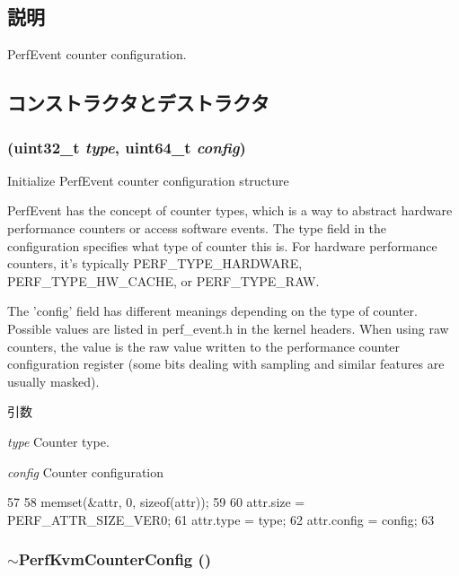 \subsection{説明}
PerfEvent counter configuration. 

\subsection{コンストラクタとデストラクタ}
\hypertarget{classPerfKvmCounterConfig_a55ed8d9cf8254a7598c16bab27f50737}{
\subsubsection[{PerfKvmCounterConfig}]{ ({\bf uint32\_\-t} {\em type}, \/  uint64\_\-t {\em config})}}
\label{classPerfKvmCounterConfig_a55ed8d9cf8254a7598c16bab27f50737}
Initialize PerfEvent counter configuration structure

PerfEvent has the concept of counter types, which is a way to abstract hardware performance counters or access software events. The type field in the configuration specifies what type of counter this is. For hardware performance counters, it's typically PERF\_\-TYPE\_\-HARDWARE, PERF\_\-TYPE\_\-HW\_\-CACHE, or PERF\_\-TYPE\_\-RAW.

The 'config' field has different meanings depending on the type of counter. Possible values are listed in perf\_\-event.h in the kernel headers. When using raw counters, the value is the raw value written to the performance counter configuration register (some bits dealing with sampling and similar features are usually masked).


\begin{DoxyParams}{引数}
\item[{\em type}]Counter type. \item[{\em config}]Counter configuration \end{DoxyParams}



\begin{DoxyCode}
57 {
58     memset(&attr, 0, sizeof(attr));
59 
60     attr.size = PERF_ATTR_SIZE_VER0;
61     attr.type = type;
62     attr.config = config;
63 }
\end{DoxyCode}
\hypertarget{classPerfKvmCounterConfig_a45c48015a9fef5897588400e50ce2ee3}{
\subsubsection[{$\sim$PerfKvmCounterConfig}]{\setlength{\rightskip}{0pt plus 5cm}$\sim${\bf PerfKvmCounterConfig} ()}}
\label{classPerfKvmCounterConfig_a45c48015a9fef5897588400e50ce2ee3}



